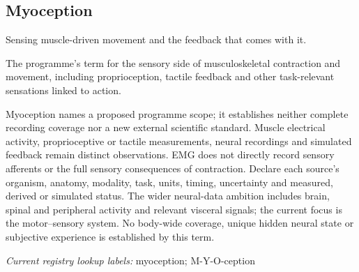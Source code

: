 \subsection*{Myoception}
\noindent Sensing muscle-driven movement and the feedback that comes with it.\par
\noindent The programme’s term for the sensory side of musculoskeletal contraction and movement, including proprioception, tactile feedback and other task-relevant sensations linked to action.\par
\noindent Myoception names a proposed programme scope; it establishes neither complete recording coverage nor a new external scientific standard. Muscle electrical activity, proprioceptive or tactile measurements, neural recordings and simulated feedback remain distinct observations. EMG does not directly record sensory afferents or the full sensory consequences of contraction. Declare each source’s organism, anatomy, modality, task, units, timing, uncertainty and measured, derived or simulated status. The wider neural-data ambition includes brain, spinal and peripheral activity and relevant visceral signals; the current focus is the motor–sensory system. No body-wide coverage, unique hidden neural state or subjective experience is established by this term.\par

\noindent\textit{Current registry lookup labels:} myoception; M-Y-O-ception\par

